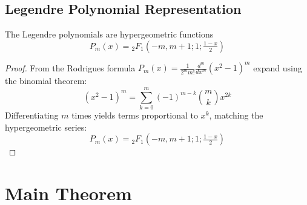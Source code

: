 \documentclass{article}
\begin{document}
\subsection{Legendre Polynomial Representation}
\begin{lemma}
  \label{lem:Legendre}
  The Legendre polynomials are hypergeometric functions
  \begin{equation*}
    P_m (x) = {}_2 F_1 (- m, m + 1 ; 1 ; \tfrac{1 - x}{2})
  \end{equation*}
\end{lemma}

\begin{proof}
  From the Rodrigues formula $P_m (x) = \frac{1}{2^m m!}  \frac{d^m}{dx^m}
  (x^2 - 1)^m$ expand using the binomial theorem:
  \begin{equation*}
    (x^2 - 1)^m = \sum_{k = 0}^m (- 1)^{m - k} \binom{m}{k} x^{2 k}
  \end{equation*}
  Differentiating $m$ times yields terms proportional to $x^k$, matching the
  hypergeometric series:
  \begin{equation*}
    P_m (x) = {}_2 F_1 \left( - m, m + 1 ; 1 ; \tfrac{1 - x}{2} \right)
  \end{equation*}
\end{proof}

\section{Main Theorem}
\end{document}
